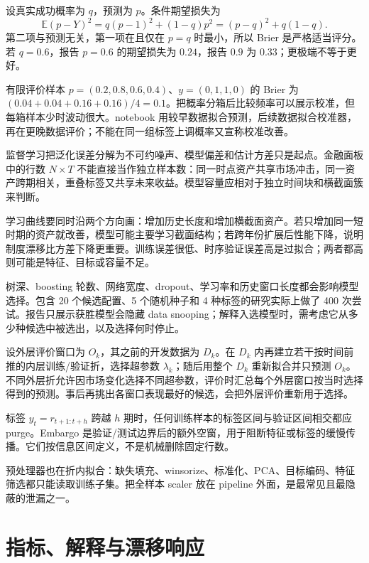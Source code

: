 
设真实成功概率为 $q$，预测为 $p$。条件期望损失为
\[
 \mathbb E(p-Y)^2=q(p-1)^2+(1-q)p^2
 =(p-q)^2+q(1-q).
\]
第二项与预测无关，第一项在且仅在 $p=q$ 时最小，所以 Brier 是严格适当评分。若 $q=0.6$，报告 $p=0.6$ 的期望损失为 $0.24$，报告 $0.9$ 为 $0.33$；更极端不等于更好。

有限评价样本 $p=(0.2,0.8,0.6,0.4)$、$y=(0,1,1,0)$ 的 Brier 为 $(0.04+0.04+0.16+0.16)/4=0.1$。把概率分箱后比较频率可以展示校准，但每箱样本少时波动很大。notebook 用较早数据拟合预测，后续数据拟合校准器，再在更晚数据评价；不能在同一组标签上调概率又宣称校准改善。


监督学习把泛化误差分解为不可约噪声、模型偏差和估计方差只是起点。金融面板中的行数 $N\times T$ 不能直接当作独立样本数：同一时点资产共享市场冲击，同一资产跨期相关，重叠标签又共享未来收益。模型容量应相对于独立时间块和横截面簇来判断。

学习曲线要同时沿两个方向画：增加历史长度和增加横截面资产。若只增加同一短时期的资产就改善，模型可能主要学习截面结构；若跨年份扩展后性能下降，说明制度漂移比方差下降更重要。训练误差很低、时序验证误差高是过拟合；两者都高则可能是特征、目标或容量不足。

树深、boosting 轮数、网络宽度、dropout、学习率和历史窗口长度都会影响模型选择。包含 20 个候选配置、5 个随机种子和 4 种标签的研究实际上做了 400 次尝试。报告只展示获胜模型会隐藏 data snooping；解释入选模型时，需考虑它从多少种候选中被选出，以及选择何时停止。


设外层评价窗口为 $O_k$，其之前的开发数据为 $D_k$。在 $D_k$ 内再建立若干按时间前推的内层训练/验证折，选择超参数 $\lambda_k$；随后用整个 $D_k$ 重新拟合并只预测 $O_k$。不同外层折允许因市场变化选择不同超参数，评价时汇总每个外层窗口按当时选择得到的预测。事后再挑出各窗口表现最好的候选，会把外层评价重新用于选择。

标签 $y_t=r_{t+1:t+h}$ 跨越 $h$ 期时，任何训练样本的标签区间与验证区间相交都应 purge。Embargo 是验证/测试边界后的额外空窗，用于阻断特征或标签的缓慢传播。它们按信息区间定义，不是机械删除固定行数。

预处理器也在折内拟合：缺失填充、winsorize、标准化、PCA、目标编码、特征筛选都只能读取训练子集。把全样本 scaler 放在 pipeline 外面，是最常见且最隐蔽的泄漏之一。

\section{指标、解释与漂移响应}

